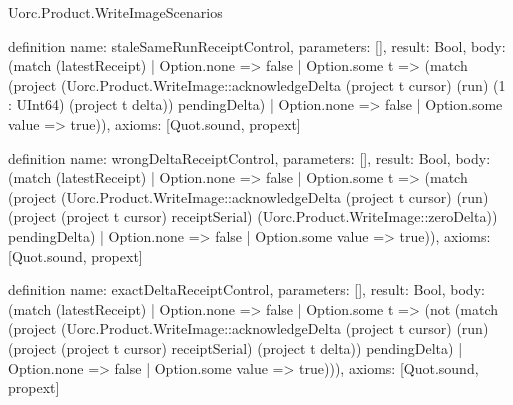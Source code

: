 \begin{lexlean}{Uorc.Product.WriteImageScenarios}
\begin{semanticmodule}
definition{
  name: staleSameRunReceiptControl,
  parameters: [],
  result: Bool,
  body: (match (latestReceipt)
    | Option.none => false
    | Option.some t => (match (project (Uorc.Product.WriteImage::acknowledgeDelta (project t cursor) (run) (1 : UInt64) (project t delta)) pendingDelta)
      | Option.none => false
      | Option.some value => true)),
  axioms: [Quot.sound, propext]
}

definition{
  name: wrongDeltaReceiptControl,
  parameters: [],
  result: Bool,
  body: (match (latestReceipt)
    | Option.none => false
    | Option.some t => (match (project (Uorc.Product.WriteImage::acknowledgeDelta (project t cursor) (run) (project (project t cursor) receiptSerial) (Uorc.Product.WriteImage::zeroDelta)) pendingDelta)
      | Option.none => false
      | Option.some value => true)),
  axioms: [Quot.sound, propext]
}

definition{
  name: exactDeltaReceiptControl,
  parameters: [],
  result: Bool,
  body: (match (latestReceipt)
    | Option.none => false
    | Option.some t => (not (match (project (Uorc.Product.WriteImage::acknowledgeDelta (project t cursor) (run) (project (project t cursor) receiptSerial) (project t delta)) pendingDelta)
      | Option.none => false
      | Option.some value => true))),
  axioms: [Quot.sound, propext]
}


\end{semanticmodule}
\end{lexlean}
